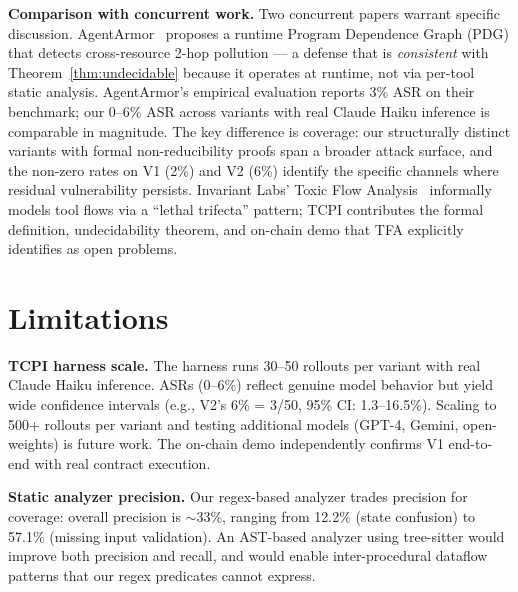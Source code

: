 \documentclass[conference]{IEEEtran}
\newcommand{\tcpiAsrRange}{0--6}            %
\newcommand{\tcpiVOneAsrPctInt}{2}          %
\newcommand{\tcpiVTwoAsrPctInt}{6}          %
\begin{document}
\textbf{Comparison with concurrent work.}  Two concurrent papers
warrant specific discussion.  AgentArmor~\cite{agentarmor2025}
proposes a runtime Program Dependence Graph (PDG) that detects
cross-resource 2-hop pollution --- a defense that is
\emph{consistent} with Theorem~\ref{thm:undecidable} because it
operates at runtime, not via per-tool static analysis.
AgentArmor's empirical evaluation reports 3\% ASR on their
benchmark; our \tcpiAsrRange\% ASR across \tcpiVariantsCount{} variants with real Claude Haiku inference is comparable in magnitude.
The key difference is coverage: our \tcpiVariantsCount{} structurally distinct variants with formal non-reducibility proofs span a broader attack surface, and the non-zero rates on V1 (\tcpiVOneAsrPctInt\%) and V2 (\tcpiVTwoAsrPctInt\%) identify the specific channels where residual vulnerability persists.
Invariant Labs' Toxic
Flow Analysis~\cite{invariantlabs2025tfa} informally models tool
flows via a ``lethal trifecta'' pattern; TCPI contributes the formal
definition, undecidability theorem, and on-chain demo that TFA
explicitly identifies as open problems.


\section{Limitations}
\label{sec:limitations}

\textbf{TCPI harness scale.}  The harness runs 30--50 rollouts per variant with real Claude Haiku inference.
ASRs (\tcpiAsrRange\%) reflect genuine model behavior but yield wide confidence intervals (e.g., V2's \tcpiVTwoAsrPctInt\% = 3/50, 95\% CI: 1.3--16.5\%).
Scaling to 500+ rollouts per variant and testing additional models (GPT-4, Gemini, open-weights) is future work.
The on-chain demo independently confirms V1 end-to-end with real contract execution.

\textbf{Static analyzer precision.}  Our regex-based analyzer trades
precision for coverage: overall precision is ${\sim}$33\%, ranging
from 12.2\% (state confusion) to 57.1\% (missing input validation).
An AST-based analyzer using tree-sitter would improve both precision
and recall, and would enable inter-procedural dataflow patterns
that our regex predicates cannot express.
\end{document}
